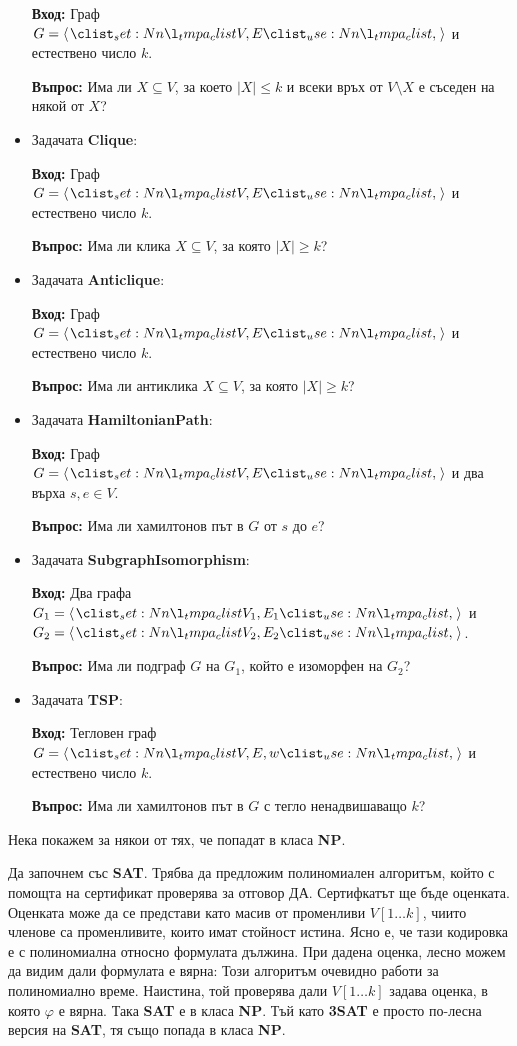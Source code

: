 \begin{itemize}
            \textbf{Вход:} Граф $G = \opair{V, E}$ и естествено число $k$.

            \textbf{Въпрос:} Има ли $X \subseteq V$, за което $|X| \leq k$ и всеки връх от $V \setminus X$ е съседен на някой от $X$?
      \item Задачата \textbf{Clique}:

            \textbf{Вход:} Граф $G = \opair{V, E}$ и естествено число $k$.

            \textbf{Въпрос:} Има ли клика $X \subseteq V$, за която $|X| \geq k$?
      \item Задачата \textbf{Anticlique}:

            \textbf{Вход:} Граф $G = \opair{V, E}$ и естествено число $k$.

            \textbf{Въпрос:} Има ли антиклика $X \subseteq V$, за която $|X| \geq k$?
      \item Задачата \textbf{HamiltonianPath}:

            \textbf{Вход:} Граф $G = \opair{V, E}$ и два върха $s, e \in V$.

            \textbf{Въпрос:} Има ли хамилтонов път в $G$ от $s$ до $e$?
      \item Задачата \textbf{SubgraphIsomorphism}:

            \textbf{Вход:} Два графа $G_1 = \opair{V_1, E_1}$ и $G_2 = \opair{V_2, E_2}$.

            \textbf{Въпрос:} Има ли подграф $G$ на $G_1$, който е изоморфен на $G_2$?
      \item Задачата \textbf{TSP}:

            \textbf{Вход:} Тегловен граф $G = \opair{V, E, w}$ и естествено число $k$.

            \textbf{Въпрос:} Има ли хамилтонов път в $G$ с тегло ненадвишаващо $k$?
\end{itemize}

Нека покажем за някои от тях, че попадат в класа \textbf{NP}.

Да започнем със \textbf{SAT}.
Трябва да предложим полиномиален алгоритъм, който с помощта на сертификат проверява за отговор ДА.
Сертифкатът ще бъде оценката.
Оценката може да се представи като масив от променливи $V[1 \dots k]$, чиито членове са променливите, които имат стойност истина.
Ясно е, че тази кодировка е с полиномиална относно формулата дължина.
При дадена оценка, лесно можем да видим дали формулата е вярна:
Този алгоритъм очевидно работи за полиномиално време.
Наистина, той проверява дали $V[1 \dots k]$ задава оценка, в която $\varphi$ е вярна.
Така \textbf{SAT} е в класа \textbf{NP}.
Тъй като \textbf{3SAT} е просто по-лесна версия на \textbf{SAT}, тя също попада в класа \textbf{NP}.

